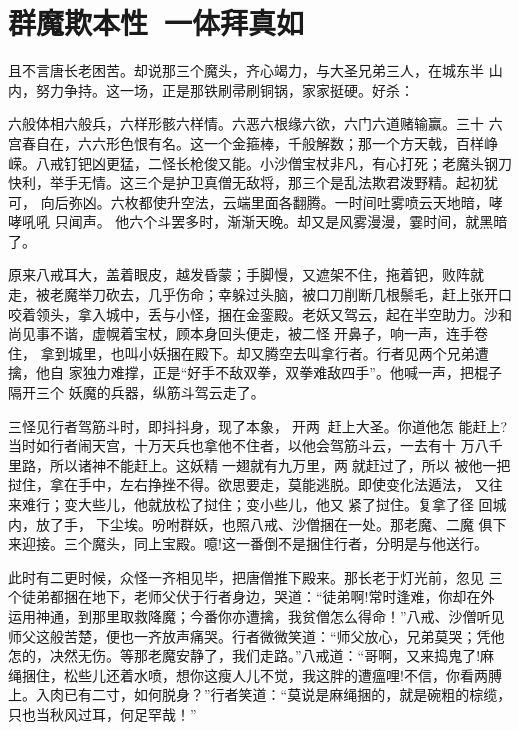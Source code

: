 \chapter{群魔欺本性~一体拜真如}

且不言唐长老困苦。却说那三个魔头，齐心竭力，与大圣兄弟三人，在城东半
山内，努力争持。这一场，正是那铁刷帚刷铜锅，家家挺硬。好杀：

六般体相六般兵，六样形骸六样情。六恶六根缘六欲，六门六道赌输赢。三十
六宫春自在，六六形色恨有名。这一个金箍棒，千般解数；那一个方天戟，百样峥
嵘。八戒钉钯凶更猛，二怪长枪俊又能。小沙僧宝杖非凡，有心打死；老魔头钢刀
快利，举手无情。这三个是护卫真僧无敌将，那三个是乱法欺君泼野精。起初犹可，
向后弥凶。六枚都使升空法，云端里面各翻腾。一时间吐雾喷云天地暗，哮哮吼吼
只闻声。
他六个斗罢多时，渐渐天晚。却又是风雾漫漫，霎时间，就黑暗了。

原来八戒耳大，盖着眼皮，越发昏蒙；手脚慢，又遮架不住，拖着钯，败阵就
走，被老魔举刀砍去，几乎伤命；幸躲过头脑，被口刀削断几根鬃毛，赶上张开口
咬着领头，拿入城中，丢与小怪，捆在金銮殿。老妖又驾云，起在半空助力。沙和
尚见事不谐，虚幌着宝杖，顾本身回头便走，被二怪开鼻子，响一声，连手卷住，
拿到城里，也叫小妖捆在殿下。却又腾空去叫拿行者。行者见两个兄弟遭擒，他自
家独力难撑，正是“好手不敌双拳，双拳难敌四手”。他喊一声，把棍子隔开三个
妖魔的兵器，纵筋斗驾云走了。

三怪见行者驾筋斗时，即抖抖身，现了本象，开两，赶上大圣。你道他怎
能赶上?当时如行者闹天宫，十万天兵也拿他不住者，以他会驾筋斗云，一去有十
万八千里路，所以诸神不能赶上。这妖精一翅就有九万里，两就赶过了，所以
被他一把挝住，拿在手中，左右挣挫不得。欲思要走，莫能逃脱。即使变化法遁法，
又往来难行；变大些儿，他就放松了挝住；变小些儿，他又紧了挝住。复拿了径
回城内，放了手，下尘埃。吩咐群妖，也照八戒、沙僧捆在一处。那老魔、二魔
俱下来迎接。三个魔头，同上宝殿。噫!这一番倒不是捆住行者，分明是与他送行。

此时有二更时候，众怪一齐相见毕，把唐僧推下殿来。那长老于灯光前，忽见
三个徒弟都捆在地下，老师父伏于行者身边，哭道：“徒弟啊!常时逢难，你却在外
运用神通，到那里取救降魔；今番你亦遭擒，我贫僧怎么得命！”八戒、沙僧听见
师父这般苦楚，便也一齐放声痛哭。行者微微笑道：“师父放心，兄弟莫哭；凭他
怎的，决然无伤。等那老魔安静了，我们走路。”八戒道：“哥啊，又来捣鬼了!麻
绳捆住，松些儿还着水喷，想你这瘦人儿不觉，我这胖的遭瘟哩!不信，你看两膊
上。入肉已有二寸，如何脱身？”行者笑道：“莫说是麻绳捆的，就是碗粗的棕缆，
只也当秋风过耳，何足罕哉！”

